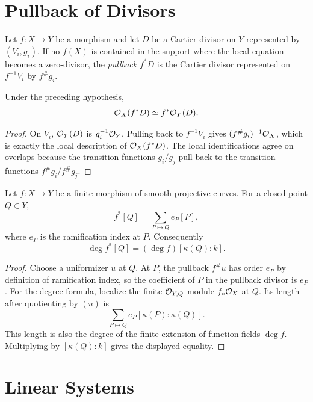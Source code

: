 \section{Pullback of Divisors}

\begin{definition}
Let \(f:X\to Y\) be a morphism and let \(D\) be a Cartier divisor on \(Y\)
represented by \((V_i,g_i)\).  If no \(f(X)\) is contained in the support where
the local equation becomes a zero-divisor, the \emph{pullback} \(f^*D\) is the
Cartier divisor represented on \(f^{-1}V_i\) by \(f^\#g_i\).
\end{definition}

\begin{proposition}
Under the preceding hypothesis,
\[
    \mathcal{O}_X(f^*D)\simeq f^*\mathcal{O}_Y(D).
\]
\end{proposition}

\begin{proof}
On \(V_i\), \(\mathcal{O}_Y(D)\) is \(g_i^{-1}\mathcal{O}_Y\).  Pulling back to
\(f^{-1}V_i\) gives \((f^\#g_i)^{-1}\mathcal{O}_X\), which is exactly the local
description of \(\mathcal{O}_X(f^*D)\).  The local identifications agree on overlaps
because the transition functions \(g_i/g_j\) pull back to the transition
functions \(f^\#g_i/f^\#g_j\).
\end{proof}

\begin{proposition}
Let \(f:X\to Y\) be a finite morphism of smooth projective curves.  For a
closed point \(Q\in Y\),
\[
    f^*[Q]=\sum_{P\mapsto Q} e_P [P],
\]
where \(e_P\) is the ramification index at \(P\).  Consequently
\[
    \deg f^*[Q]=(\deg f)[\kappa(Q):k].
\]
\end{proposition}

\begin{proof}
Choose a uniformizer \(u\) at \(Q\).  At \(P\), the pullback \(f^\#u\) has order
\(e_P\) by definition of ramification index, so the coefficient of \(P\) in the
pullback divisor is \(e_P\).  For the degree formula, localize the finite
\(\mathcal{O}_{Y,Q}\)-module \(f_*\mathcal{O}_X\) at \(Q\).  Its length after quotienting by
\((u)\) is
\[
    \sum_{P\mapsto Q} e_P[\kappa(P):\kappa(Q)].
\]
This length is also the degree of the finite extension of function fields
\(\deg f\).  Multiplying by \([\kappa(Q):k]\) gives the displayed equality.
\end{proof}

\section{Linear Systems}

